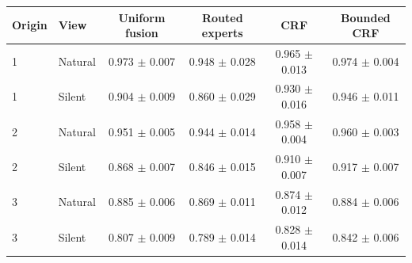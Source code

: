 \begin{tabular}{llcccc}
\toprule
Origin & View & Uniform fusion & Routed experts & CRF & Bounded CRF \\
\midrule
1 & Natural & 0.973 $\pm$ 0.007 & 0.948 $\pm$ 0.028 & 0.965 $\pm$ 0.013 & 0.974 $\pm$ 0.004 \\
1 & Silent & 0.904 $\pm$ 0.009 & 0.860 $\pm$ 0.029 & 0.930 $\pm$ 0.016 & 0.946 $\pm$ 0.011 \\
2 & Natural & 0.951 $\pm$ 0.005 & 0.944 $\pm$ 0.014 & 0.958 $\pm$ 0.004 & 0.960 $\pm$ 0.003 \\
2 & Silent & 0.868 $\pm$ 0.007 & 0.846 $\pm$ 0.015 & 0.910 $\pm$ 0.007 & 0.917 $\pm$ 0.007 \\
3 & Natural & 0.885 $\pm$ 0.006 & 0.869 $\pm$ 0.011 & 0.874 $\pm$ 0.012 & 0.884 $\pm$ 0.006 \\
3 & Silent & 0.807 $\pm$ 0.009 & 0.789 $\pm$ 0.014 & 0.828 $\pm$ 0.014 & 0.842 $\pm$ 0.006 \\
\bottomrule
\end{tabular}
